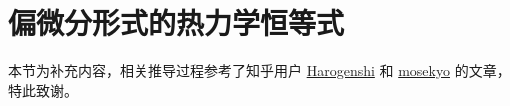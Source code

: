 \ifx\allfiles\undefined
{}  %
\usepackage[dvipsnames]{xcolor}
\usepackage{amsmath}   %
\usepackage{graphicx}
\usetikzlibrary{arrows, calc, decorations.pathmorphing}
\allowdisplaybreaks %
\newcommand{\pa}{\partial}
\newcommand{\mathminus}{\!\!-\!\!} %
\newcommand{\vsup}[1]{\raisebox{-0.1ex}{$\scriptstyle #1$}}
\newcommand{\lsup}[1]{\raisebox{-0.85ex}{$\scriptstyle #1$}}




\else
\fi
\section{偏微分形式的热力学恒等式}
本节为补充内容，相关推导过程参考了知乎用户 \href{https://zhuanlan.zhihu.com/p/622282265}{Harogenshi} 
和 \href{https://zhuanlan.zhihu.com/p/115068655}{mosekyo} 的文章，特此致谢。

